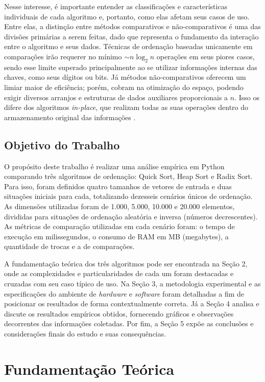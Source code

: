 \documentclass[12pt,a4paper]{article}
\begin{document}
Nesse interesse, é importante entender as classificações e características individuais de cada algoritmo e, portanto, como elas afetam seus casos de uso. Entre elas, a distinção entre métodos comparativos e não-comparativos é uma das divisões primárias a serem feitas, dado que representa o fundamento da interação entre o algoritmo e seus dados. Técnicas de ordenação baseadas unicamente em comparações irão requerer no mínimo $\sim n \log_2 n$ operações em seus piores casos, sendo esse limite superado principalmente ao se utilizar informações internas das chaves, como seus dígitos ou bits. Já métodos não-comparativos oferecem um limiar maior de eficiência; porém, cobram na otimização do espaço, podendo exigir diversos arranjos e estruturas de dados auxiliares proporcionais a $n$. Isso os difere dos algoritmos \textit{in-place}, que realizam todas as suas operações dentro do armazenamento original das informações \cite{sedgewick2011}.

\subsection{Objetivo do Trabalho}
O propósito deste trabalho é realizar uma análise empírica em Python comparando três algoritmos de ordenação: Quick Sort, Heap Sort e Radix Sort. Para isso, foram definidos quatro tamanhos de vetores de entrada e duas situações iniciais para cada, totalizando dezesseis cenários únicos de ordenação. As dimensões utilizadas foram de 1.000, 5.000, 10.000 e 20.000 elementos, divididas para situações de ordenação aleatória e inversa (números decrescentes). As métricas de comparação utilizadas em cada cenário foram: o tempo de execução em milissegundos, o consumo de RAM em MB (megabytes), a quantidade de trocas e a de comparações.

A fundamentação teórica dos três algoritmos pode ser encontrada na Seção 2, onde as complexidades e particularidades de cada um foram destacadas e cruzadas com seu caso típico de uso. Na Seção 3, a metodologia experimental e as especificações do ambiente de \textit{hardware} e \textit{software} foram detalhadas a fim de posicionar os resultados de forma contextualmente correta. Já a Seção 4 analisa e discute os resultados empíricos obtidos, fornecendo gráficos e observações decorrentes das informações coletadas. Por fim, a Seção 5 expõe as conclusões e considerações finais do estudo e suas consequências.

\section{Fundamentação Teórica}
\end{document}
